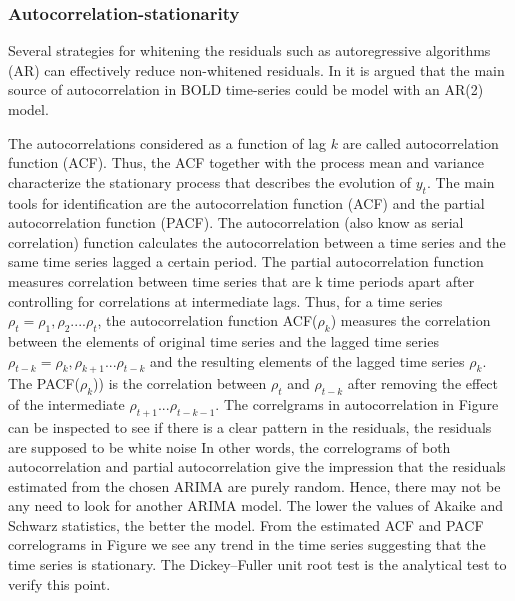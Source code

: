 \documentclass[10pt,letterpaper]{article}
\begin{document}

\subsubsection*{Autocorrelation-stationarity}

Several strategies for whitening the residuals such as autoregressive 
algorithms (AR) can effectively reduce non-whitened residuals. In \cite{monti2011statistical} it is argued that the main source of autocorrelation in BOLD time-series could be model with an AR(2) model.

The autocorrelations considered as a function of lag $k$ are called autocorrelation function (ACF). Thus, the ACF together with the process mean and variance characterize the stationary process that describes the evolution of $y_t$. 
The main tools for identification are the autocorrelation function (ACF) and the partial autocorrelation function (PACF).
The autocorrelation (also know as serial correlation) function calculates the autocorrelation between a time series and the same time series lagged a certain period.
The partial autocorrelation function measures correlation between time series that are k time periods apart after controlling for correlations at intermediate lags. Thus, for a time series $\rho_t = \rho_1, \rho_2 ....\rho_t$, the autocorrelation function ACF($\rho_k$) measures the correlation between the elements of original time series and the lagged time series $\rho_{t-k} = \rho_k, \rho_{k+1} ...\rho_{t-k}$ 
and the resulting elements of the lagged time series $\rho_k$. 
The PACF($\rho_k$)) is the correlation between $\rho_t$ and $\rho_{t-k}$ after removing the effect of the intermediate $\rho_{t+1} ...\rho_{t-k-1}$.
The correlgrams in autocorrelation in Figure can be inspected to see if there is a clear pattern in the residuals, the residuals are supposed to be white noise 
In other words, the correlograms of both autocorrelation and partial autocorrelation give the impression that the residuals estimated from the chosen ARIMA are purely random. Hence, there may not be any need to look for another ARIMA model.
The  lower the values of Akaike and Schwarz statistics, the better the model.
From the estimated ACF and PACF correlograms in Figure we see any trend in the time series suggesting that the  time series is stationary. The Dickey–Fuller unit root test is the analytical test to verify this point.
\end{document}

